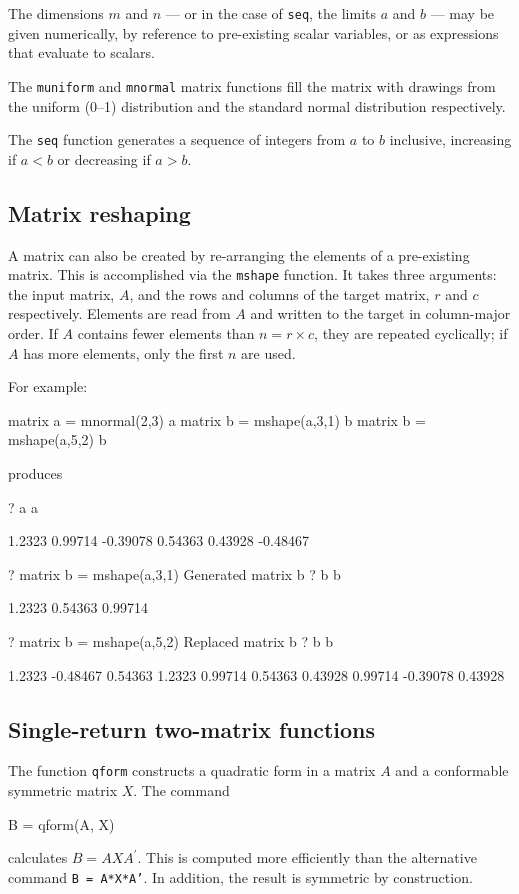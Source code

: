 The dimensions $m$ and $n$ --- or in the case of \texttt{seq}, the
limits $a$ and $b$ --- may be given numerically, by reference to
pre-existing scalar variables, or as expressions that evaluate to
scalars.

The \texttt{muniform} and \texttt{mnormal} matrix functions fill the
matrix with drawings from the uniform (0--1) distribution and the
standard normal distribution respectively.

The \texttt{seq} function generates a sequence of integers from $a$
to $b$ inclusive, increasing if $a<b$ or decreasing if $a>b$.

\subsection{Matrix reshaping}
\label{matrix-mshape}

A matrix can also be created by re-arranging the elements of a
pre-existing matrix. This is accomplished via the \texttt{mshape}
function. It takes three arguments: the input matrix, $A$, and the
rows and columns of the target matrix, $r$ and $c$ respectively.
Elements are read from $A$ and written to the target in column-major
order.  If $A$ contains fewer elements than $n = r \times c$, they are
repeated cyclically; if $A$ has more elements, only the first $n$ are
used.

For example:
\begin{code}
matrix a = mnormal(2,3)
a
matrix b = mshape(a,3,1)
b
matrix b = mshape(a,5,2)
b
\end{code}
produces
\begin{code}
?   a
a

      1.2323      0.99714     -0.39078
     0.54363      0.43928     -0.48467

?   matrix b = mshape(a,3,1)
Generated matrix b
?   b
b

      1.2323
     0.54363
     0.99714

?   matrix b = mshape(a,5,2)
Replaced matrix b
?   b
b

      1.2323     -0.48467
     0.54363       1.2323
     0.99714      0.54363
     0.43928      0.99714
    -0.39078      0.43928
\end{code}

\subsection{Single-return two-matrix functions}
\label{matrix-two}

The function \texttt{qform} constructs a quadratic form in a matrix
$A$ and a conformable symmetric matrix $X$.  The command
%
\begin{code}
B = qform(A, X)
\end{code}
%
calculates $B = A X A^{\prime}$.  This is computed more efficiently than
the alternative command \texttt{B = A*X*A'}.  In addition, the result
is symmetric by construction.


